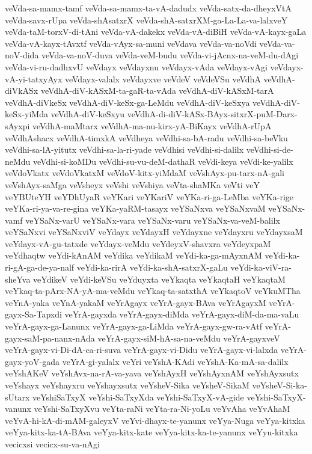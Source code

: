 {veVda-sa-mamx-tamf
veVda-sa-mamx-ta-vA-dadudx
veVda-satx-da-dheyxVtA
veVda-savx-rUpa
veVda-shAsatxrX
veVda-shA-satxrXM-ga-La-La-va-lalxveY
veVda-taM-torxV-di-tAni
veVda-vA-dakekx
veVda-vA-diBiH
veVda-vA-kayx-gaLa
veVda-vA-kayx-tAvxtf
veVda-vAyx-sa-muni
veVdava
veVda-va-noVdi
veVda-va-noV-dida
veVda-va-noV-duva
veVda-veM-budu
veVda-vi-jAcnx-na-veM-du-dAgi
veVda-vi-ru-dadhxvU
veVdayx
veVdayxnu
veVdayx-vAda
veVdayx-vAgi
veVdayx-vA-yi-tatxyAyx
veVdayx-valalx
veVdayxve
veVdeV
veVdeVSu
veVdhA
veVdhA-diVkASx
veVdhA-diV-kASxM-ta-gaR-ta-vAda
veVdhA-diV-kASxM-tarA
veVdhA-diVkeSx
veVdhA-diV-keSx-ga-LeMdu
veVdhA-diV-keSxya
veVdhA-diV-keSx-yiMda
veVdhA-diV-keSxyu
veVdhA-di-diV-kASx-BAyx-sitxrX-puM-Darx-sAyxpi
veVdhA-maMtarx
veVdhA-ma-nu-kirx-yA-BiKayx
veVdhA-rUpA
veVdhAshacx
veVdhA-timxkA
veVdheya
veVdhi-sa-bA-radu
veVdhi-sa-beVku
veVdhi-sa-lA-yitutx
veVdhi-sa-la-ri-yade
veVdhisi
veVdhi-si-dalilx
veVdhi-si-de-neMdu
veVdhi-si-koMDu
veVdhi-su-vu-deM-dathaR
veVdi-keya
veVdi-ke-yalilx
veVdoVkatx
veVdoVkatxM
veVdoV-kitx-yiMdaM
veVshAyx-pu-tarx-nA-gali
veVshAyx-saMga
veVsheyx
veVshi
veVshiya
veVta-shaMKa
veVti
veY
veYBUteYH
veYDhUyaR
veYKari
veYKariV
veYKa-ri-ga-LeMba
veYKa-rige
veYKa-ri-ya-va-re-gina
veYKa-yaRM-tasayx
veYSaNxva
veYSaNxvaM
veYSaNx-vamf
veYSaNx-varU
veYSaNx-vara
veYSaNx-varu
veYSaNx-va-veM-balilx
veYSaNxvi
veYSaNxviV
veYdayx
veYdayxH
veYdayxne
veYdayxru
veYdayxsaM
veYdayx-vA-gu-tatxde
veYdayx-veMdu
veYdeyxV-shavxra
veYdeyxpaM
veYdhaqtw
veYdi-kAnAM
veYdika
veYdikaM
veYdi-ka-ga-mAyxnAM
veYdi-ka-ri-gA-ga-de-ya-nalf
veYdi-ka-rirA
veYdi-ka-shA-satxrX-gaLu
veYdi-ka-viV-ra-sheYva
veYdikeV
veYdi-keVSu
veYduyxta
veYkaqta
veYkaqtaH
veYkaqtaM
veYkaq-ta-pArx-NA-yA-ma-veMdu
veYkaq-ta-satxthA
veYkaqtoV
veYkuMTha
veYnA-yaka
veYnA-yakaM
veYrAgayx
veYrA-gayx-BAva
veYrAgayxM
veYrA-gayx-Sa-Tapxdi
veYrA-gayxda
veYrA-gayx-diMda
veYrA-gayx-diM-da-ma-vaLu
veYrA-gayx-ga-Lanunx
veYrA-gayx-ga-LiMda
veYrA-gayx-gw-ra-vAtf
veYrA-gayx-saM-pa-nanx-nAda
veYrA-gayx-siM-hA-sa-na-veMdu
veYrA-gayxveV
veYrA-gayx-vi-Di-dA-ca-ri-suva
veYrA-gayx-vi-Didu
veYrA-gayx-vi-lalxda
veYrA-gayx-yoV-gada
veYrA-gi-yalalx
veYri
veYshA-KAdi
veYshA-Ka-mA-sa-dalilx
veYshAKeV
veYshAvx-na-rA-va-yava
veYshAyxH
veYshAyxnAM
veYshAyxsutx
veYshayx
veYshayxru
veYshayxsutx
veYsheV-Sika
veYsheV-SikaM
veYsheV-Si-ka-sUtarx
veYshiSaTxyX
veYshi-SaTxyXda
veYshi-SaTxyX-vA-gide
veYshi-SaTxyX-vanunx
veYshi-SaTxyXvu
veYta-raNi
veYta-ra-Ni-yoLu
veYvAha
veYvAhaM
veYvA-hi-kA-di-mAM-galeyxV
veYvi-dhayx-te-yanunx
veYya-Nuga
veYya-kitxka
veYya-kitx-ka-tA-BAva
veYya-kitx-kate
veYya-kitx-ka-te-yanunx
veYyu-kitxka
vecicxsi
vecicx-su-va-nAgi
}
